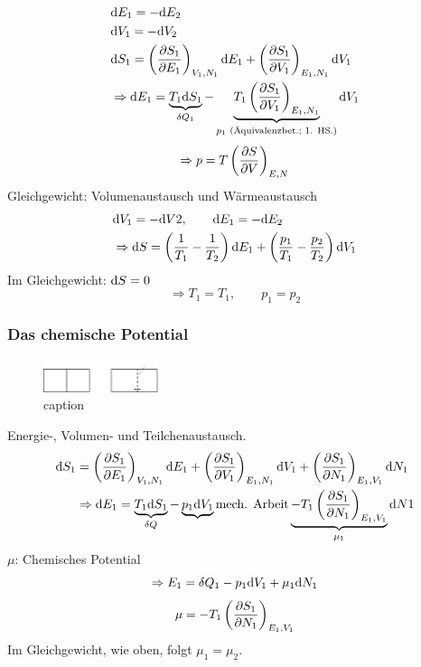 \begin{equation}
    \begin{split}
        & \mathrm{d} E_1 = - \mathrm{d} E_2 \\
        & \mathrm{d} V_1 = - \mathrm{d} V_2 \\
        & \mathrm{d} S_1 = \left( \frac{\partial S_1}{\partial E_1} \right)_{V_1, N_1} \mathrm{d} E_1 + \left( \frac{\partial S_1}{\partial V_1} \right)_{E_1, N_1} \mathrm{d} V_1 \\
        & \Rightarrow \mathrm{d} E_1 = \underbrace{T_1 \mathrm{d} S_1}_{\delta Q_1} - \underbrace{T_1 \left( \frac{\partial S_1}{\partial V_1} \right)_{E_1, N_1}}_{p_1 \text{ (Äquivalenzbet.; 1. HS.)}} \mathrm{d} V_1
    \end{split}
\end{equation}
\begin{equation}
    \Rightarrow p = T \left( \frac{\partial S}{\partial V} \right)_{E, N}
\end{equation}
Gleichgewicht: Volumenaustausch und Wärmeaustausch
\begin{equation}
    \begin{split}
        & \mathrm{d} V_1 = - \mathrm{d} V2, \qquad \mathrm{d} E_1 = - \mathrm{d} E_2 \\
        & \Rightarrow \mathrm{d} S = \left( \frac{1}{T_1} - \frac{1}{T_2} \right) \mathrm{d} E_1 + \left( \frac{p_1}{T_1} - \frac{p_2}{T_2} \right) \mathrm{d} V_1
    \end{split}
\end{equation}
Im Gleichgewicht: $\mathrm{d} S = 0$
\begin{equation}
    \Rightarrow T_1 = T_1 , \qquad p_1 = p_2
\end{equation}
\subsubsection{Das chemische Potential}
\begin{figure}[H]
    \begin{center}
        \includegraphics[width=0.3\textwidth]{../img/derivationMu.pdf}
        \caption{caption}  %
        \label{img:derivationMu}
    \end{center}
\end{figure}
Energie-, Volumen- und Teilchenaustausch.
\begin{equation}
    \begin{split}
        \mathrm{d} S_1 &= \left( \frac{\partial S_1}{\partial E_1} \right)_{V_1, N_1} \mathrm{d} E_1 + \left( \frac{\partial S_1}{\partial V_1} \right)_{E_1, N_1} \mathrm{d} V_1 + \left( \frac{\partial S_1}{\partial N_1} \right)_{E_1, V_1} \mathrm{d} N_1 \\
        & \Rightarrow \mathrm{d} E_1 = \underbrace{T_1 \mathrm{d} S_1}_{\delta Q} - \underbrace{p_1 \mathrm{d} V_1}{\text{mech. Arbeit}}
        \underbrace{- T_1 \left( \frac{\partial S_1}{\partial N_1} \right)_{E_1, V_1}}_{\mu_1} \mathrm{d} N1
    \end{split}
\end{equation}
$\mu$: Chemisches Potential
\begin{equation}
    \Rightarrow E_1 = \delta Q_1 - p_1 \mathrm{d} V_1 + \mu_1 \mathrm{d} N_1
\end{equation}
\begin{equation}
    \mu = - T_1 \left( \frac{\partial S_1}{\partial N_1} \right)_{E_1, V_1}
\end{equation}
Im Gleichgewicht, wie oben, folgt $\mu_1 = \mu_2$.

